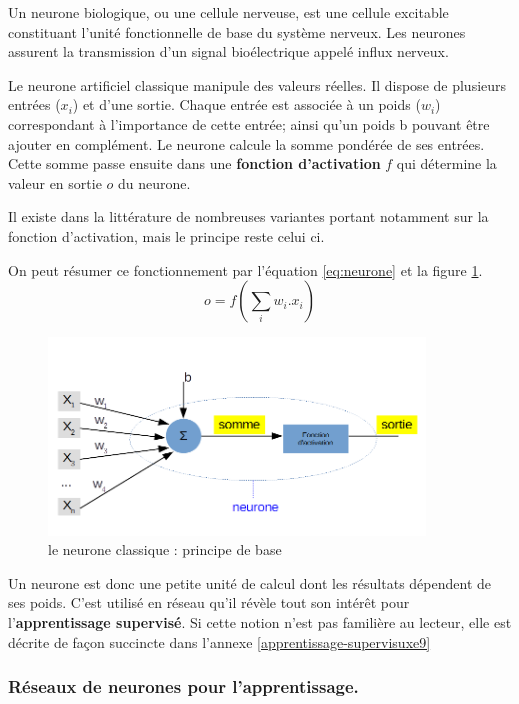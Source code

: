 Un neurone biologique, ou une cellule nerveuse, est une cellule
excitable constituant l'unité fonctionnelle de base du système nerveux.
Les neurones assurent la transmission d'un signal bioélectrique appelé
influx nerveux.

Le neurone artificiel classique manipule des valeurs réelles. Il dispose
de plusieurs entrées (\(x_i\)) et d'une sortie. Chaque entrée est
associée à un poids (\(w_i\)) correspondant à l'importance de cette
entrée; ainsi qu'un poids b pouvant être ajouter en complément. Le
neurone calcule la somme pondérée de ses entrées. Cette somme passe
ensuite dans une \textbf{fonction d'activation} \(f\) qui détermine la
valeur en sortie \(o\) du neurone.

Il existe dans la littérature de nombreuses variantes portant notamment
sur la fonction d'activation, mais le principe reste celui ci.

On peut résumer ce fonctionnement par l'équation \ref{eq:neurone} et la
figure \ref{fig:neurone}. \begin{equation}
\label{eq:neurone}
o = f(\sum_i {w_i . x_i })
\end{equation}

\begin{figure}[h!]
\label{fig:neurone}
\centering
\includegraphics[width=10cm]{./images/neurone.png}
\caption{le neurone classique : principe de base}
\end{figure}

Un neurone est donc une petite unité de calcul dont les résultats
dépendent de ses poids. C'est utilisé en réseau qu'il révèle tout son
intérêt pour l'\textbf{apprentissage supervisé}. Si cette notion n'est
pas familière au lecteur, elle est décrite de façon succincte dans
l'annexe \ref{apprentissage-supervisuxe9}

\hypertarget{ruxe9seaux-de-neurones-pour-lapprentissage.}{%
\subsubsection{Réseaux de neurones pour
l'apprentissage.}\label{ruxe9seaux-de-neurones-pour-lapprentissage.}}


